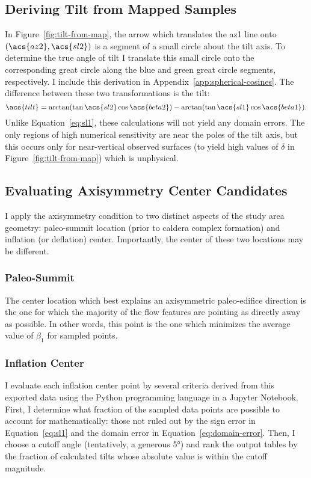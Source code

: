 \subsection{Deriving Tilt from Mapped Samples}
In Figure~\ref{fig:tilt-from-map}, the arrow which translates the \acs{az1} line onto $\left(\acs{az2},\acs{sl2}\right)$ is a segment of a small circle about the tilt axis. To determine the true angle of tilt I translate this small circle onto the corresponding great circle along the blue and green great circle segments, respectively. I include this derivation in Appendix~\ref{app:spherical-cosines}. The difference between these two transformations is the tilt: 
\begin{equation}
    \acs{tilt} = \arctan(\tan\acs{sl2}\cos\acs{beta2}) - \arctan(\tan\acs{sl1}\cos\acs{beta1}).\label{eq:tilt-from-map}
\end{equation}
Unlike Equation~\eqref{eq:sl1}, these calculations will not yield any domain errors. The only regions of high numerical sensitivity are near the poles of the tilt axis, but this occurs only for near-vertical observed surfaces (to yield high values of $\delta$ in Figure~\ref{fig:tilt-from-map}) which is unphysical.

\subsection{Evaluating Axisymmetry Center Candidates}

I apply the axisymmetry condition to two distinct aspects of the study area geometry: paleo-summit location (prior to caldera complex formation) and inflation (or deflation) center. Importantly, the center of these two locations may be different.

\subsubsection{Paleo-Summit}

The center location which best explains an axisymmetric paleo-edifice direction is the one for which the majority of the flow features are pointing as directly away as possible. In other words, this point is the one which minimizes the average value of $\beta_1$ for sampled points.

\subsubsection{Inflation Center}

I evaluate each inflation center point by several criteria derived from this exported data using the Python programming language in a Jupyter Notebook. First, I determine what fraction of the sampled data points are possible to account for mathematically: those not ruled out by the sign error in Equation~\eqref{eq:sl1} and the domain error in Equation~\eqref{eq:domain-error}. Then, I choose a cutoff angle (tentatively, a generous \ang{5}) and rank the output tables by the fraction of calculated tilts whose absolute value is within the cutoff magnitude. 

